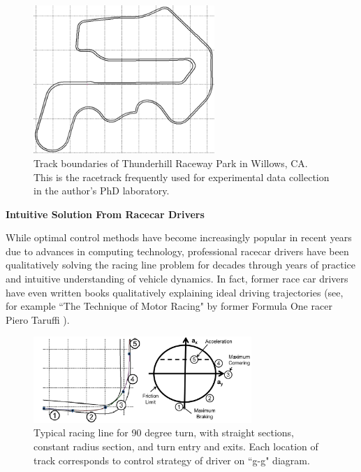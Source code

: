 \documentclass[10pt,a4paper]{article}
\def\subsection#1{\refstepcounter{subsection} \noindent
{\normalsize\bf {\thesubsection}} \hspace{0.5mm} {\normalsize\bf #1} \par}
\begin{document}
\begin{figure}[h]
\centering
\includegraphics[width=2.7in]{figures/trackBoundaries.png}
\caption{Track boundaries of Thunderhill Raceway Park in Willows, CA. This is the racetrack frequently used for experimental data collection in the author's PhD laboratory.}
\label{fig:trackBoundaries}
\end{figure}

\subsection{Intuitive Solution From Racecar Drivers}
\label{sec:bro}

While optimal control methods have become increasingly popular in recent years due to advances in computing technology, professional racecar drivers have been qualitatively solving the
racing line problem for decades through years of practice and intuitive understanding of vehicle dynamics. In fact, former race car drivers have even written books qualitatively
explaining ideal driving trajectories (see, for example ``The Technique of Motor Racing" by former Formula One racer Piero Taruffi \cite{taruffi}).

\begin{figure}[h]
\centering
\includegraphics[width=3.25in]{figures/ggDiagram.png}
\caption{Typical racing line for 90 degree turn, with straight sections, constant radius section, and turn entry and exits. Each location of track corresponds to control strategy 
of driver on ``g-g" diagram.}
\label{fig:ggDiagram}
\end{figure}
\end{document}
